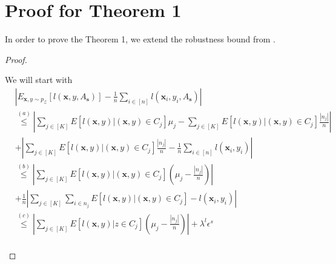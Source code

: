 \documentclass{article}
\begin{document}
\section{Proof for Theorem 1}
In order to prove the Theorem 1, we extend the robustness bound from \cite{robust}.
\begin{proof}
\begin{small}
We will start with
\[
\begin{aligned}
&\left|E_{\mathbf{x},y \sim p_\mathcal{Z}}[l(\mathbf{x},y, A_\mathbf{s})] - \frac{1}{n}\sum_{i \in [n]} l(\mathbf{x}_i,y_i,A_\mathbf{s})\right| \\
&\overset{(a)}{\leq} \left|\sum_{j \in [K]} E[l(\mathbf{x},y)| (\mathbf{x},y) \in C_j] \mu_{j} -  \sum_{j \in [K]} E[l(\mathbf{x},y)| (\mathbf{x},y) \in C_j] \frac{|n_j|}{n} \right| \\
 &+  \left| \sum_{j \in [K]} E[l(\mathbf{x},y)| (\mathbf{x},y) \in C_j] \frac{|n_j|}{n}  - \frac{1}{n}\sum_{i \in [n]} l(\mathbf{x}_i,y_i) \right| \\
  &\overset{(b)}{\leq}\left|\sum_{j \in [K]} E[l(\mathbf{x},y)| (\mathbf{x},y) \in C_j] (\mu_{j} -   \frac{|n_j|}{n}) \right|\\
 &+\frac{1}{n} \left|\sum_{j \in [K]} \sum_{i \in n_j} E[l(\mathbf{x},y)| (\mathbf{x},y) \in C_j]  - l(\mathbf{x}_i,y_i)\right| \\
   &\overset{(c)}{\leq} \left|\sum_{j \in [K]} E[l(\mathbf{x},y)|z \in C_j] (\mu_{j} -   \frac{|n_j|}{n})\right| + \lambda^l \epsilon^s  \\
 \end{aligned}
\]
\end{small}


\end{proof}
\end{document}
